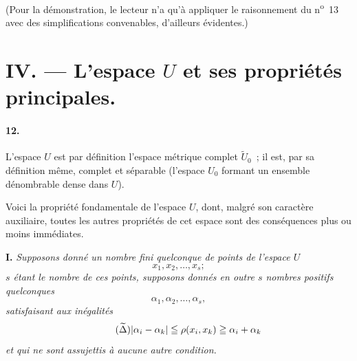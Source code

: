 \documentclass[a4paper,12pt]{amsart}
\begin{document}
(Pour la démonstration, le lecteur n'a qu'à appliquer le raisonnement du n\textsuperscript{o}~13 avec des simplifications convenables, d'ailleurs évidentes.)

\section*{IV. --- L'espace $U$ et ses propriétés principales.}
\paragraph{12.}
L'espace $U$ est par définition l'espace métrique complet $\widetilde{U}_0$~; il est, par sa définition même, complet et séparable (l'espace $U_0$ formant un ensemble dénombrable dense dans $U$).

Voici la propriété fondamentale de l'espace $U$, dont, malgré son caractère auxiliaire, toutes les autres propriétés de cet espace sont des conséquences plus ou moins immédiates.

\textbf{I.} \textit{Supposons donné un nombre fini quelconque de points de l'espace $U$}
\[
x_1,x_2,\dots,x_s;
\]
\textit{$s$ étant le nombre de ces points, supposons donnés en outre $s$ nombres positifs quelconques}
\[
\alpha_1,\alpha_2,\dots,\alpha_s,
\]
\textit{satisfaisant aux inégalités}
\begin{equation}\tag{$\widetilde{\Delta}$}
|\alpha_i-\alpha_k|\leqq\rho(x_i,x_k)\geqq\alpha_i+\alpha_k
\end{equation}
\textit{et qui ne sont assujettis à aucune autre condition.}
\end{document}
